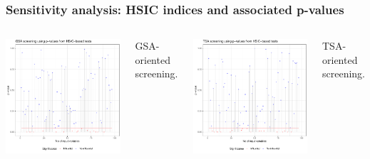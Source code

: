 \documentclass[aspectratio=169]{beamer}
\begin{document}
\begin{frame}
\frametitle{Sensitivity analysis: HSIC indices and associated p-values}

  
  \begin{columns}
    
\includegraphics[width=.9\textwidth]{figures/plot_pval_GSA_MDTE.pdf}

\centering 
\small GSA-oriented screening.


\includegraphics[width=.9\textwidth]{figures/plot_pval_TSA_MDTE.pdf}

\centering 
\small TSA-oriented screening.

\end{columns}


\end{frame}
\end{document}

